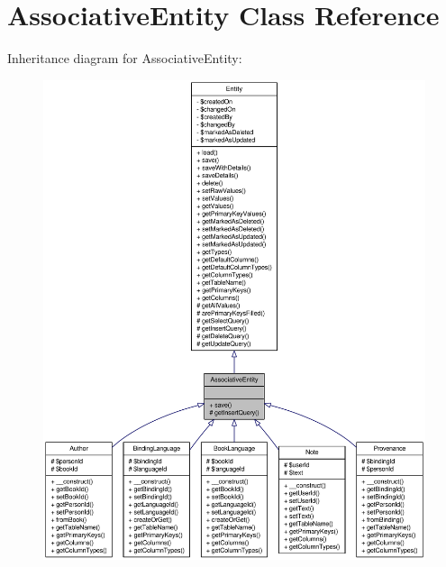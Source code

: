 \hypertarget{classAssociativeEntity}{
\section{AssociativeEntity Class Reference}
\label{classAssociativeEntity}
}


Inheritance diagram for AssociativeEntity:\nopagebreak
\begin{figure}[H]
\begin{center}
\leavevmode
\includegraphics[width=400pt]{classAssociativeEntity__inherit__graph}
\end{center}
\end{figure}



